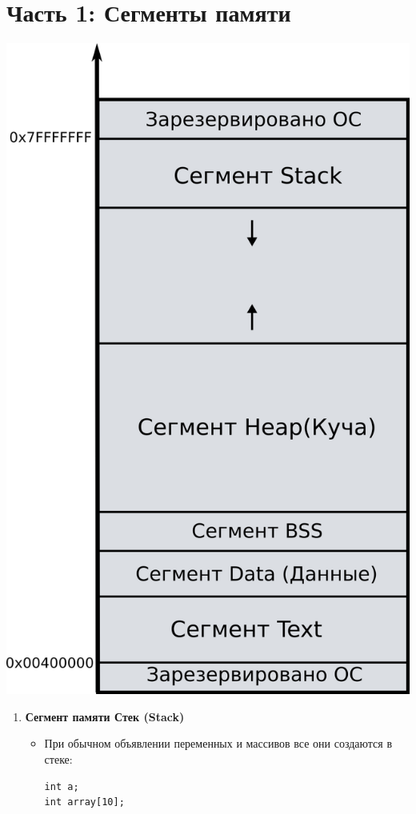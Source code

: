 \documentclass{article}
\begin{document}
\section*{Часть 1: Сегменты памяти}
\begin{multicols}{2}
\begin{center}
\includegraphics[scale=1.1]{../images/memory_layout.png}
\end{center}
\columnbreak
\begin{enumerate}
\item \textbf{Сегмент памяти Стек (Stack)} \\
\begin{itemize}
\item При обычном объявлении переменных и массивов все они создаются в стеке: 
\begin{lstlisting}
int a; 
int array[10];
\end{lstlisting}



\end{itemize}
\end{enumerate}
\end{multicols}
\end{document}
